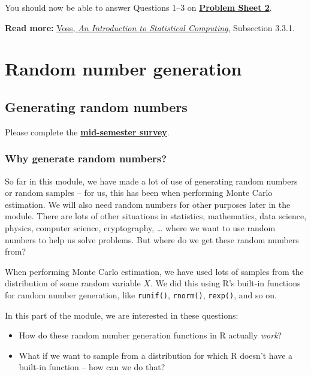 \documentclass[
  letterpaper,
  DIV=11,
  numbers=noendperiod]{scrreprt}
\theoremstyle{plain}
\theoremstyle{definition}
\theoremstyle{definition}
\theoremstyle{remark}
\begin{document}
You should now be able to answer Questions 1--3 on
\hyperref[P2]{\textbf{Problem Sheet 2}}.

\textbf{Read more:}
\href{https://leeds.primo.exlibrisgroup.com/permalink/44LEE_INST/1fj430b/cdi_askewsholts_vlebooks_9781118728031}{Voss,
\emph{An Introduction to Statistical Computing}}, Subsection 3.3.1.

\part{Random number generation}

\chapter{Generating random numbers}\label{generating-random-numbers}

Please complete the
\href{https://forms.office.com/e/T1s1md6Jxi}{\textbf{mid-semester
survey}}.

\section{Why generate random
numbers?}\label{why-generate-random-numbers}

So far in this module, we have made a lot of use of generating random
numbers or random samples -- for us, this has been when performing Monte
Carlo estimation. We will also need random numbers for other purposes
later in the module. There are lots of other situations in statistics,
mathematics, data science, physics, computer science, cryptography,
\ldots{} where we want to use random numbers to help us solve problems.
But where do we get these random numbers from?

When performing Monte Carlo estimation, we have used lots of samples
from the distribution of some random variable \(X\). We did this using
R's built-in functions for random number generation, like
\texttt{runif()}, \texttt{rnorm()}, \texttt{rexp()}, and so on.

In this part of the module, we are interested in these questions:

\begin{itemize}
\item
  How do these random number generation functions in R actually
  \emph{work}?
\item
  What if we want to sample from a distribution for which R doesn't have
  a built-in function -- how can we do that?
\end{itemize}
\end{document}

